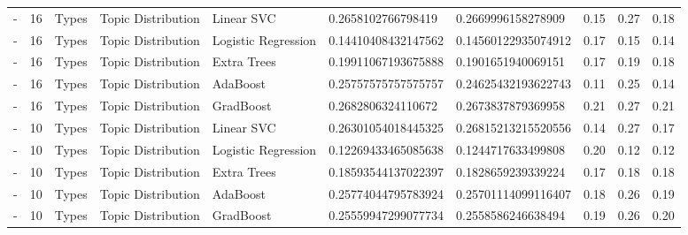\begin{table}[]
\begin{tabular}{@{}llllllllll@{}}
    -                   & 16              & Types                 & Topic Distribution    & Linear SVC          & 0.2658102766798419      & 0.2669996158278909     & 0.15               & 0.27            & 0.18              \\
    -                   & 16              & Types                 & Topic Distribution    & Logistic Regression & 0.14410408432147562     & 0.14560122935074912    & 0.17               & 0.15            & 0.14              \\
    -                   & 16              & Types                 & Topic Distribution    & Extra Trees         & 0.19911067193675888     & 0.1901651940069151     & 0.17               & 0.19            & 0.18              \\
    -                   & 16              & Types                 & Topic Distribution    & AdaBoost            & 0.25757575757575757     & 0.24625432193622743    & 0.11               & 0.25            & 0.14              \\
    -                   & 16              & Types                 & Topic Distribution    & GradBoost           & 0.2682806324110672      & 0.2673837879369958     & 0.21               & 0.27            & 0.21              \\
    -                   & 10              & Types                 & Topic Distribution    & Linear SVC          & 0.26301054018445325     & 0.26815213215520556    & 0.14               & 0.27            & 0.17              \\
    -                   & 10              & Types                 & Topic Distribution    & Logistic Regression & 0.12269433465085638     & 0.1244717633499808     & 0.20               & 0.12            & 0.12              \\
    -                   & 10              & Types                 & Topic Distribution    & Extra Trees         & 0.18593544137022397     & 0.1828659239339224     & 0.17               & 0.18            & 0.18              \\
    -                   & 10              & Types                 & Topic Distribution    & AdaBoost            & 0.25774044795783924     & 0.25701114099116407    & 0.18               & 0.26            & 0.19              \\
    -                   & 10              & Types                 & Topic Distribution    & GradBoost           & 0.25559947299077734     & 0.2558586246638494     & 0.19               & 0.26            & 0.20              \\

\end{tabular}
\end{table}
